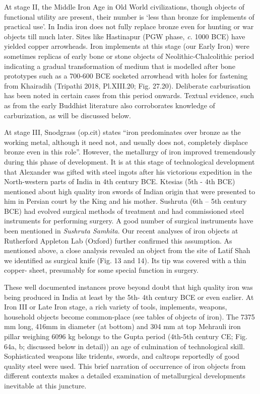 At stage II, the Middle Iron Age in Old World civilizations, though objects of functional utility are present, their number is ‘less than bronze for implements of practical use’. In India iron does not fully replace bronze even for hunting or war objects till much later. Sites like Hastinapur (PGW phase, \textit{c.} 1000 BCE) have yielded copper arrowheads. Iron implements at this stage (our Early Iron) were sometimes replicas of early bone or stone objects of Neolithic-Chalcolithic period indicating a gradual transformation of medium that is modelled after bone prototypes such as a 700-600 BCE socketed arrowhead with holes for fastening from Khairadih (Tripathi 2018, Pl.XIII.20; Fig. 27.20). Deliberate carburisation has been noted in certain cases from this period onwards. Textual evidence, such as from the early Buddhist literature also corroborates knowledge of carburization, as will be discussed below.

At stage III, Snodgrass (op.cit) states “iron predominates over bronze as the working metal, although it need not, and usually does not, completely displace bronze even in this role”. However, the metallurgy of iron improved tremendously during this phase of development. It is at this stage of technological development that Alexander was gifted with steel ingots after his victorious expedition in the North-western parts of India in 4th century BCE. Ktesias (5th - 4th BCE) mentioned about high quality iron swords of Indian origin that were presented to him in Persian court by the King and his mother. Sushruta (6th – 5th century BCE) had evolved surgical methods of treatment and had commissioned steel instruments for performing surgery. A good number of surgical instruments have been mentioned in \textit{Sushruta Samhita}. Our recent analyses of iron objects at Rutherford Appleton Lab (Oxford) further confirmed this assumption. As mentioned above, a close analysis revealed an object from the site of Latif Shah we identified as surgical knife (Fig. 13 and 14). Its tip was covered with a thin copper- sheet, presumably for some special function in surgery.

These well documented instances prove beyond doubt that high quality iron was being produced in India at least by the 5th- 4th century BCE or even earlier. At Iron III or Late Iron stage, a rich variety of tools, implements, weapons, household objects become common-place (see tables of objects of iron). The 7375 mm long, 416mm in diameter (at bottom) and 304 mm at top Mehrauli iron pillar weighing 6096 kg belongs to the Gupta period (4th-5th century CE; Fig. 64a, b; discussed below in detail)) an age of culmination of technological skill. Sophisticated weapons like tridents, swords, and caltrops reportedly of good quality steel were used. This brief narration of occurrence of iron objects from different contexts makes a detailed examination of metallurgical developments inevitable at this juncture.

